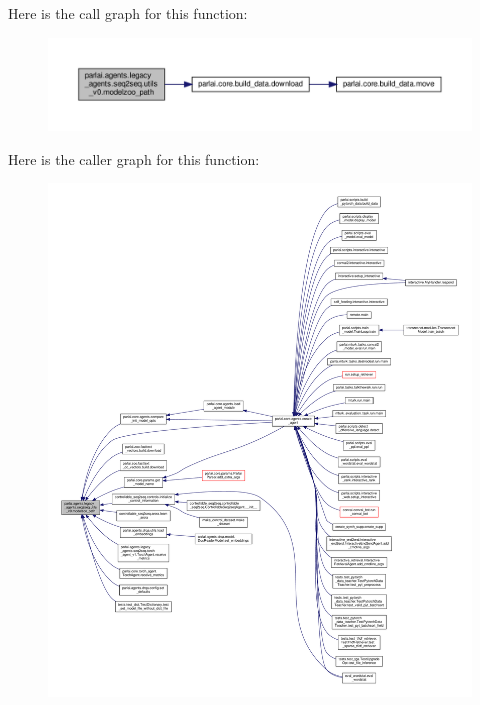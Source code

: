 Here is the call graph for this function\+:
\nopagebreak
\begin{figure}[H]
\begin{center}
\leavevmode
\includegraphics[width=350pt]{namespaceparlai_1_1agents_1_1legacy__agents_1_1seq2seq_1_1utils__v0_a5fbd3301b67f00d6d146fb01c7cd7626_cgraph}
\end{center}
\end{figure}
Here is the caller graph for this function\+:
\nopagebreak
\begin{figure}[H]
\begin{center}
\leavevmode
\includegraphics[width=350pt]{namespaceparlai_1_1agents_1_1legacy__agents_1_1seq2seq_1_1utils__v0_a5fbd3301b67f00d6d146fb01c7cd7626_icgraph}
\end{center}
\end{figure}
\mbox{\label{namespaceparlai_1_1agents_1_1legacy__agents_1_1seq2seq_1_1utils__v0_af377ec61bfc0423461e7b409ffc883b9}} 
